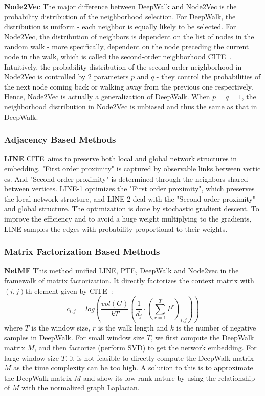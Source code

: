 \documentclass[a4paper]{article}
\newcommand{\citehere}{\textcolor[rgb]{1,0,0}{CITE\ }}
\begin{document}
\noindent \textbf{Node2Vec} The major difference between DeepWalk and Node2Vec is the probability distribution of the neighborhood selection. For DeepWalk, the distribution is uniform - each neighbor is equally likely to be selected. For Node2Vec, the distribution of neighbors is dependent on the list of nodes in the random walk - more specifically, dependent on the node preceding the current node in the walk, which is called the second-order neighborhood \citehere{}. Intuitively, the probability distribution of the second-order neighborhood in Node2Vec is controlled by 2 parameters $p$ and $q$ - they control the probabilities of the next node coming back or walking away from the previous one respectively. Hence, Node2Vec is actually a generalization of DeepWalk. When $p = q = 1$, the neighborhood distribution in Node2Vec is unbiased and thus the same as that in DeepWalk.

\subsubsection{Adjacency Based Methods} %

\noindent \textbf{LINE} \citehere aims to preserve both local and global network structures in embedding. "First order proximity" is captured by observable links between vertic es. And "Second order proximity" is determined through the neighbors shared between vertices. LINE-1 optimizes the "First order proximity", which preserves the local network structure, and LINE-2 deal with the "Second order proximity" and global structure. The optimization is done by stochastic gradient descent. To improve the efficiency and to avoid a huge weight multiplying to the gradients, LINE samples the edges with probability proportional to their weights.


\subsubsection{Matrix Factorization Based Methods} %


\noindent \textbf{NetMF} This method unified LINE, PTE, DeepWalk and Node2vec in the framewalk of matrix factorization. It directly factorizes the context matrix with $(i,j)$th element given by \citehere:
$$
c_{i,j} = log(\frac{vol(G)}{kT}(\frac{1}{d_j} \cdot (\sum\limits_{r=1}^T P^r)_{i,j}))
$$
\noindent where $T$ is the window size, $r$ is the walk length and $k$ is the number of negative samples in DeepWalk. For small window size $T$, we first compute the DeepWalk matrix $M$, and then factorize (perform SVD) to get the network embedding. For large window size $T$, it is not feasible to directly compute the DeepWalk matrix $M$ as the time complexity can be too high. A solution to this is to approximate the DeepWalk matrix $M$ and show its low-rank nature by using the relationship of  $M$ with the normalized graph Laplacian.
\end{document}
